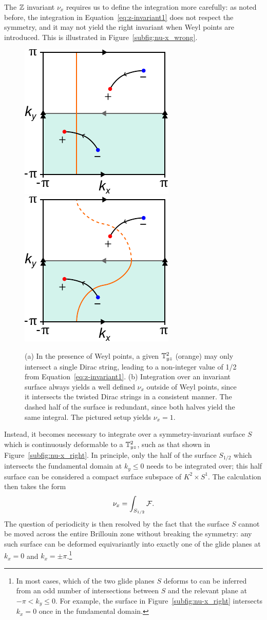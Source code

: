 The $\mathbb{Z}$ invariant $\nu_x$ requires us to define the integration more carefully: as noted before, the integration in Equation~\eqref{eq:z-invariant1} does not respect the symmetry, and it may not yield the right invariant when Weyl points are introduced. This is illustrated in Figure~\ref{subfig:nu-x_wrong}.
\begin{figure}[htb!]
	\centering
	\subcaptionbox{\label{subfig:nu-x_wrong}} {\includegraphics[width=.3\textwidth]{Images/nu-x_wrong}}
	\hfil
	\subcaptionbox{\label{subfig:nu-x_right}} {\includegraphics[width=.3\textwidth]{Images/nu-x_right}}
	\caption{(a) In the presence of Weyl points, a given $\mathbb{T}_{yz}^2$ (orange) may only intersect a single Dirac string, leading to a non-integer value of 1/2 from Equation~\eqref{eq:z-invariant1}. (b) Integration over an invariant surface always yields a well defined $\nu_x$ outside of Weyl points, since it intersects the twisted Dirac strings in a consistent manner. The dashed half of the surface is redundant, since both halves yield the same integral. The pictured setup yields $\nu_x=1$.}
	\label{fig:nu-x}
\end{figure}
Instead, it becomes necessary to integrate over a symmetry-invariant surface $S$ which is continuously deformable to a $\mathbb{T}_{yz}^2$, such as that shown in Figure~\ref{subfig:nu-x_right}. In principle, only the half of the surface $S_{1/2}$ which intersects the fundamental domain at $k_y\leq 0$ needs to be integrated over; this half surface can be considered a compact surface subspace of $K^2\times S^1$. The calculation then takes the form
\begin{equation}\label{eq:z-invariant2}
	\nu_x = \int_{S_{1/2}}\mathcal{F}.
\end{equation}
The question of periodicity is then resolved by the fact that the surface $S$ cannot be moved across the entire Brillouin zone without breaking the symmetry: any such surface can be deformed equivariantly into exactly one of the glide planes at $k_x=0$ and $k_x=\pm\pi$.\footnote{
	In most cases, which of the two glide planes $S$ deforms to can be inferred from an odd number of intersections between $S$ and the relevant plane at $-\pi<k_y\leq 0$. For example, the surface in Figure~\ref{subfig:nu-x_right} intersects $k_x=0$ once in the fundamental domain.}
	
